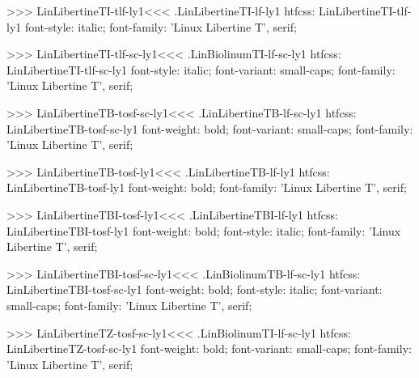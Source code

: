 {{{>>>
\<LinLibertineTI-tlf-ly1\><<<
.LinLibertineTI-lf-ly1
htfcss:  LinLibertineTI-tlf-ly1  font-style: italic; font-family: 'Linux Libertine T', serif;

>>>
\<LinLibertineTI-tlf-sc-ly1\><<<
.LinBiolinumTI-lf-sc-ly1
htfcss:  LinLibertineTI-tlf-sc-ly1  font-style: italic; font-variant: small-caps; font-family: 'Linux Libertine T', serif;

>>>
\<LinLibertineTB-tosf-sc-ly1\><<<
.LinLibertineTB-lf-sc-ly1
htfcss:  LinLibertineTB-tosf-sc-ly1  font-weight: bold; font-variant: small-caps; font-family: 'Linux Libertine T', serif;

>>>
\<LinLibertineTB-tosf-ly1\><<<
.LinLibertineTB-lf-ly1
htfcss:  LinLibertineTB-tosf-ly1  font-weight: bold; font-family: 'Linux Libertine T', serif;

>>>
\<LinLibertineTBI-tosf-ly1\><<<
.LinLibertineTBI-lf-ly1
htfcss:  LinLibertineTBI-tosf-ly1  font-weight: bold; font-style: italic; font-family: 'Linux Libertine T', serif;

>>>
\<LinLibertineTBI-tosf-sc-ly1\><<<
.LinBiolinumTB-lf-sc-ly1
htfcss:  LinLibertineTBI-tosf-sc-ly1  font-weight: bold; font-style: italic; font-variant: small-caps; font-family: 'Linux Libertine T', serif;

>>>
\<LinLibertineTZ-tosf-sc-ly1\><<<
.LinBiolinumTI-lf-sc-ly1
htfcss:  LinLibertineTZ-tosf-sc-ly1  font-weight: bold; font-variant: small-caps; font-family: 'Linux Libertine T', serif;

}}}

